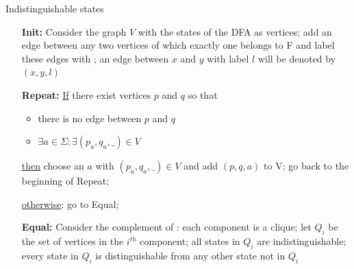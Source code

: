 \begin{algo} Indistinguishable states \label{gelijketoestanden}
\begin{enumerate}
\item[{\bf Init:}]
Consider the graph $V$ with the states of the DFA as vertices; add an
edge between any two vertices of which exactly one belongs to F and
label these edges with \eps; an edge between $x$ and $y$ with label
$l$ will be denoted by $(x,y,l)$


\item[{\bf Repeat:}]
\underline{If} there exist vertices $p$ and $q$ so that
\begin{itemize}
\item there is no edge between $p$ and $q$
\item $\exists a \in \Sigma: \exists (p_a,q_a,\_) \in V$
\end{itemize}
\underline{then} choose an $a$ with $(p_a,q_a,\_) \in V$
and add $(p,q,a)$ to V; go back to the beginning of Repeat;

\underline{otherwise}: go to Equal;

\item[{\bf Equal:}]
Consider the complement of : each component is a clique; let $Q_i$
be the set of vertices in the $i^{th}$ component; all states in $Q_i$
are indistinguishable; every state in $Q_i$ is distinguishable from
any other state not in $Q_i$

\end{enumerate}

\end{algo}
